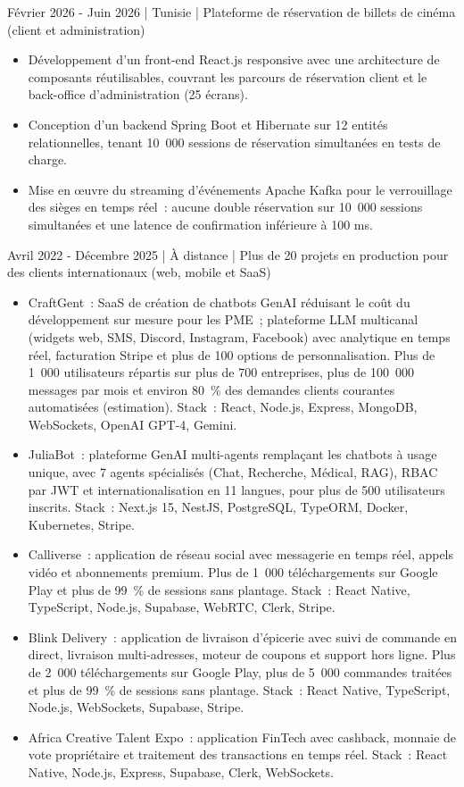   {Février 2026 - Juin 2026 | Tunisie | Plateforme de réservation de billets de cinéma (client et administration)}
\begin{itemize}
  \item Développement d'un front-end React.js responsive avec une architecture de composants réutilisables, couvrant les parcours de réservation client et le back-office d'administration (25 écrans).
  \item Conception d'un backend Spring Boot et Hibernate sur 12 entités relationnelles, tenant 10~000 sessions de réservation simultanées en tests de charge.
  \item Mise en œuvre du streaming d'événements Apache Kafka pour le verrouillage des sièges en temps réel~: aucune double réservation sur 10~000 sessions simultanées et une latence de confirmation inférieure à 100 ms.
\end{itemize}

  {Avril 2022 - Décembre 2025 | À distance | Plus de 20 projets en production pour des clients internationaux (web, mobile et SaaS)}
\begin{itemize}
  \item CraftGent~: SaaS de création de chatbots GenAI réduisant le coût du développement sur mesure pour les PME~; plateforme LLM multicanal (widgets web, SMS, Discord, Instagram, Facebook) avec analytique en temps réel, facturation Stripe et plus de 100 options de personnalisation. Plus de 1~000 utilisateurs répartis sur plus de 700 entreprises, plus de 100~000 messages par mois et environ 80~\% des demandes clients courantes automatisées (estimation). Stack~: React, Node.js, Express, MongoDB, WebSockets, OpenAI GPT-4, Gemini.
  \item JuliaBot~: plateforme GenAI multi-agents remplaçant les chatbots à usage unique, avec 7 agents spécialisés (Chat, Recherche, Médical, RAG), RBAC par JWT et internationalisation en 11 langues, pour plus de 500 utilisateurs inscrits. Stack~: Next.js 15, NestJS, PostgreSQL, TypeORM, Docker, Kubernetes, Stripe.
  \item Calliverse~: application de réseau social avec messagerie en temps réel, appels vidéo et abonnements premium. Plus de 1~000 téléchargements sur Google Play et plus de 99~\% de sessions sans plantage. Stack~: React Native, TypeScript, Node.js, Supabase, WebRTC, Clerk, Stripe.
  \item Blink Delivery~: application de livraison d'épicerie avec suivi de commande en direct, livraison multi-adresses, moteur de coupons et support hors ligne. Plus de 2~000 téléchargements sur Google Play, plus de 5~000 commandes traitées et plus de 99~\% de sessions sans plantage. Stack~: React Native, TypeScript, Node.js, WebSockets, Supabase, Stripe.
  \item Africa Creative Talent Expo~: application FinTech avec cashback, monnaie de vote propriétaire et traitement des transactions en temps réel. Stack~: React Native, Node.js, Express, Supabase, Clerk, WebSockets.
\end{itemize}


